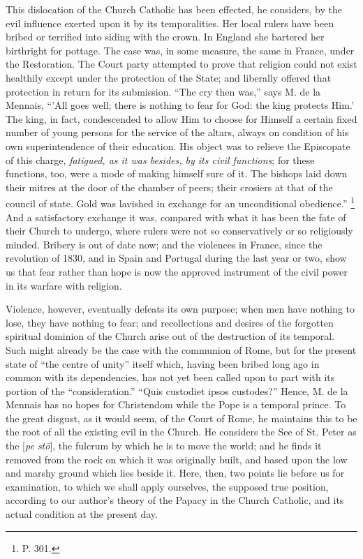 This dislocation of the Church Catholic has been
effected, he considers, by the evil influence exerted upon it by its
temporalities. Her local rulers have been bribed or terrified into
siding with the crown. In England she bartered her birthright for
pottage. The case was, in some measure, the same in France, under the
Restoration. The Court party attempted to prove that religion could
not exist healthily except under the protection of the State; and
liberally offered that protection in return for its submission. ``The
cry then was,'' says M. de la Mennais, ``'All goes well; there is
nothing to fear for God: the king protects Him.' The king, in fact,
condescended to allow Him to choose for Himself a certain fixed number
of young persons for the service of the altars, always on condition of
his own superintendence of their education. His object was to relieve
the Episcopate of this charge, \emph{fatigued, as it was besides, by its
civil functions}; for these functions, too, were a mode of making
himself sure of it. The bishops laid down their mitres at the door of
the chamber of peers; their crosiers at that of the council of state.
Gold was lavished in exchange for an unconditional obedience.'' \footnote{P. 301.} And a satisfactory exchange it was, compared with what it has
been the fate of their Church to undergo, where rulers were not
so conservatively or so religiously minded. Bribery is out of date
now; and the violences in France, since the revolution of 1830, and in
Spain and Portugal during the last year or two, show us that fear
rather than hope is now the approved instrument of the civil power in
its warfare with religion.

Violence, however, eventually defeats its own
purpose; when men have nothing to lose, they have nothing to fear; and
recollections and desires of the forgotten spiritual dominion of the
Church arise out of the destruction of its temporal. Such might
already be the case with the communion of Rome, but for the present
state of ``the centre of unity'' itself which, having been bribed long
ago in common with its dependencies, has not yet been called upon to
part with its portion of the ``consideration.'' ``Quis custodiet ipsos
custodes?'' Hence, M. de la Mennais has no hopes for Christendom while
the Pope is a temporal prince. To the great disgust, as it would seem,
of the Court of Rome, he maintains this to be the root of all the
existing evil in the Church. He considers the See of St. Peter as the
[\emph{pe st\={o}}], the fulcrum by which he is to move the world;
and he finds it removed from the rock on which it was originally
built, and based upon the low and marshy ground which lies beside it.
Here, then, two points lie before us for examination, to which we
shall apply ourselves, the supposed true position, according to our
author's theory of the Papacy in the Church Catholic, and its actual
condition at the present day.

